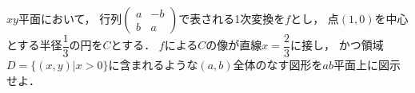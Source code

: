 \documentclass[../../main.tex]{subfiles}
\begin{document}
$xy$平面において，
行列$
\begin{pmatrix} a & -b \\ b & a
\end{pmatrix}$で表される1次変換を$f$とし，
点$(1,0)$を中心とする半径$\displaystyle\dfrac{1}{3}$の円を$C$とする．
$f$による$C$の像が直線$\displaystyle x=\dfrac{2}{3}$に接し，
かつ領域$D=\{(x,y)|x>0\}$に含まれるような$(a,b)$全体のなす図形を$ab$平面上に図示せよ．
\end{document}
